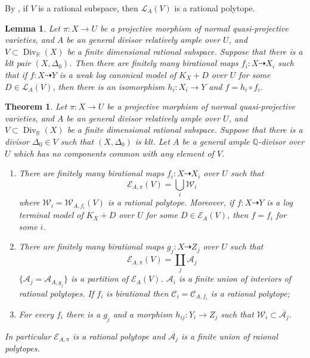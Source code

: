 \documentclass{article}
\newtheorem{lem}[defn]{Lemma}
\newtheorem{thm}[defn]{Theorem}
\begin{document}
By \cite[Lemma 3.7.2]{birkarExistenceMinimalModels2009}, if $V$  is a rational subspace, then $\mathcal{L}_{A}(V)$ is a rational polytope.
\begin{lem}\label{finitewlcm}
  \cite[Theorem E]{birkarExistenceMinimalModels2009} Let $\pi:X\to U$ be a projective morphism of normal quasi-projective varieties, and $A$ be an general divisor relatively ample over $U$, and $V \subset \operatorname{Div}_{\mathbb{R}}(X)$ be a finite dimensional rational subspace. Suppose that there is a klt pair $(X,\Delta_{0})$. Then there are finitely many birational maps $f_{i}:X \dashrightarrow X_{i}$ such that if $f:X \dashrightarrow  Y$ is a weak log canonical model of $K_{X}+D$ over $U$ for some $D \in \mathcal{L}_{A}(V)$, then there is an isomorphism  $h_{i}:X_{i} \to Y$  and $f=h_{i}\circ f_{i}$.  

\end{lem}

\begin{thm}\label{finitemodel}
\cite[Corollary 1.1.5]{birkarExistenceMinimalModels2009}Let $\pi:X\to U$ be a projective morphism of normal quasi-projective varieties, and $A$ be an general divisor relatively ample over $U$, and $V \subset \operatorname{Div}_{\mathbb{R}}(X)$ be a finite dimensional rational subspace. Suppose that there is a divisor $\Delta_{0} \in V$ such that $(X,\Delta_{0})$ is klt. Let $A$ be a general ample $\mathbb{Q}$-divisor over $U$ which has no components common with any element of $V$.  
  \begin{enumerate}
    \item   There are finitely many birational maps $f_{i}:X \dashrightarrow   X_{i}$ over $U$ such that 
      \[
        \mathcal{E}_{A,\pi}(V) =\bigcup_{i}\mathcal{W}_{i}
      \]
      where  $\mathcal{W}_{i}=\mathcal{W}_{A,f_{i}}(V)$ is a rational polytope. Moreover, if  $f:X \dashrightarrow  Y$ is a  log terminal model of $K_{X}+D$ over $U$ for some $D \in \mathcal{E}_{A}(V)$, then  $f=f_{i}$ for some $i$.  

    \item   There are finitely many birational maps $g_{j}:X \dashrightarrow  Z_{j}$ over $U$ such that
      \[
        \mathcal{E}_{A,\pi}(V) =\coprod_{j}\mathcal{A}_{j}
      \]
      $ \{\mathcal{A}_j=\mathcal{A}_{A,g_j}\} $ is a partition of $ \mathcal{E}_{A}(V) $. $ \mathcal{A}_i $ is a finite union of interiors of rational polytopes. If $ f_i $ is birational then $ \mathcal{C}_i=\mathcal{C}_{A,f_i} $ is a rational polytope;
      \item  For every  $f_{i}$ there is a $g_{j}$ and a morphism $h_{ij}:Y_{i}\to Z_{j}$ such that $\mathcal{W}_{i} \subset \overline{\mathcal{A}_{j}}$.   
  \end{enumerate}
  In particular $\mathcal{E}_{A,\pi}$ is a rational polytope and  $\overline{\mathcal{A}_{j}}$ is a finite union of raional polytopes. 
\end{thm}
\end{document}
